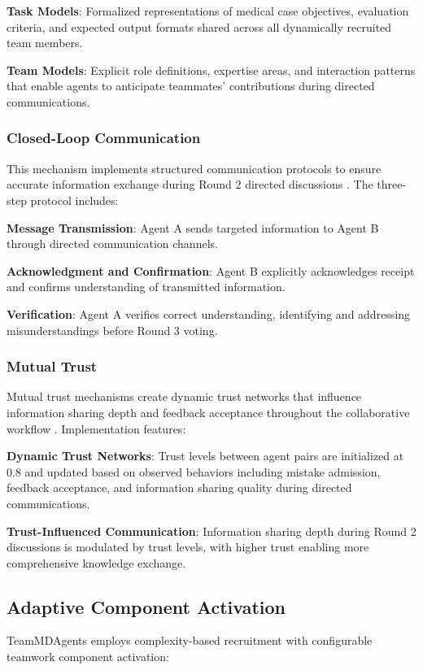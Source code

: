 \documentclass[letterpaper]{article} %
\begin{document}
\textbf{Task Models}: Formalized representations of medical case objectives, evaluation criteria, and expected output formats shared across all dynamically recruited team members.

\textbf{Team Models}: Explicit role definitions, expertise areas, and interaction patterns that enable agents to anticipate teammates' contributions during directed communications.

\subsubsection{Closed-Loop Communication}
This mechanism implements structured communication protocols to ensure accurate information exchange during Round 2 directed discussions \cite{cannon1995team}. The three-step protocol includes:

\textbf{Message Transmission}: Agent A sends targeted information to Agent B through directed communication channels.

\textbf{Acknowledgment and Confirmation}: Agent B explicitly acknowledges receipt and confirms understanding of transmitted information.

\textbf{Verification}: Agent A verifies correct understanding, identifying and addressing misunderstandings before Round 3 voting.

\subsubsection{Mutual Trust}
Mutual trust mechanisms create dynamic trust networks that influence information sharing depth and feedback acceptance throughout the collaborative workflow \cite{webber2002trust}. Implementation features:

\textbf{Dynamic Trust Networks}: Trust levels between agent pairs are initialized at 0.8 and updated based on observed behaviors including mistake admission, feedback acceptance, and information sharing quality during directed communications.

\textbf{Trust-Influenced Communication}: Information sharing depth during Round 2 discussions is modulated by trust levels, with higher trust enabling more comprehensive knowledge exchange.

\subsection{Adaptive Component Activation}

TeamMDAgents employs complexity-based recruitment with configurable teamwork component activation:
\end{document}

